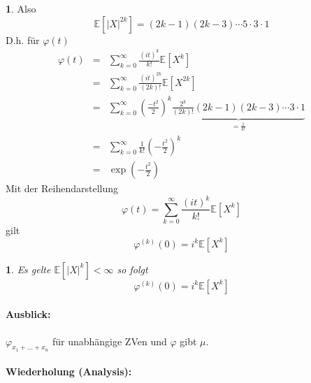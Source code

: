 \documentclass[10pt,a4paper]{report}
\numberwithin{equation}{section}
\numberwithin{figure}{section}
\theoremstyle{plain}
\theoremstyle{definition}
\newtheorem{example}[thm]{\protect\examplename}
\theoremstyle{remark}
\theoremstyle{plain}
\newtheorem{lem}[thm]{\protect\lemmaname}
\providecommand{\examplename}{Beispiel}
\providecommand{\lemmaname}{Lemma}
\newcommand{\1}{ \mathbb{1} } %
\begin{document}
\begin{example}
Also 
\[
\mathbb{E}\left[\left|X\right|^{2k}\right]=\left(2k-1\right)\left(2k-3\right)\cdots5\cdot3\cdot1
\]
D.h. für $\varphi\left(t\right)$
\begin{eqnarray*}
\varphi\left(t\right) & = & \sum_{k=0}^{\infty}\frac{\left(it\right)^{k}}{k!}\mathbb{E}\left[X^{k}\right]\\
 & = & \sum_{k=0}^{\infty}\frac{\left(it\right)^{2k}}{\left(2k\right)!}\mathbb{E}\left[X^{2k}\right]\\
 & = & \sum_{k=0}^{\infty}\left(\frac{-t^{2}}{2}\right)^{k}\underset{=\frac{1}{k!}}{\underbrace{\frac{2^{k}}{(2k)!}\left(2k-1\right)\left(2k-3\right)\cdots3\cdot1}}\\
 & = & \sum_{k=0}^{\infty}\frac{1}{k!}\left(-\frac{t^{2}}{2}\right)^{k}\\
 & = & \exp\left(-\frac{t^{2}}{2}\right)
\end{eqnarray*}
Mit der Reihendarstellung 
\[
\varphi\left(t\right)=\sum_{k=0}^{\infty}\frac{\left(it\right)^{k}}{k!}\mathbb{E}\left[X^{k}\right]
\]
gilt
\[
\varphi^{(k)}\left(0\right)=i^{k}\mathbb{E}\left[X^{k}\right]
\]
 \end{example}
\begin{lem}
Es gelte $\mathbb{E}\left[\left|X\right|^{k}\right]<\infty$ so folgt
\[
\varphi^{\left(k\right)}\left(0\right)=i^{k}\mathbb{E}\left[X^{k}\right]
\]

\end{lem}

\paragraph*{Ausblick:}

$\varphi_{x_{1}+\ldots+x_{n}}$ für unabhängige ZVen und $\varphi$
gibt $\mu$.



\paragraph*{Wiederholung (Analysis): }
\end{document}
